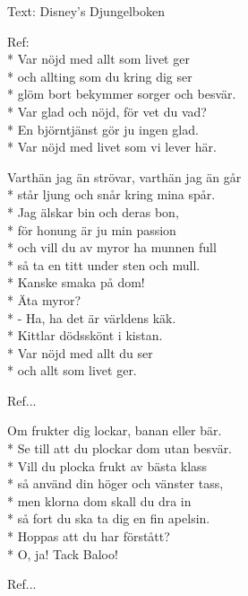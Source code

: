\begin{SongText}
    \begin{SongInfo}
        Text: Disney's Djungelboken
    \end{SongInfo}
    \begin{SongVerse}
        Ref:\\*%
        Var nöjd med allt som livet ger\\*%
        och allting som du kring dig ser\\*%
        glöm bort bekymmer sorger och besvär.\\*%
        Var glad och nöjd, för vet du vad?\\*%
        En björntjänst gör ju ingen glad.\\*%
        Var nöjd med livet som vi lever här.
    \end{SongVerse}
    \begin{SongVerse}
        Varthän jag än strövar, varthän jag än går\\*%
        står ljung och snår kring mina spår.\\*%
        Jag älskar bin och deras bon,\\*%
        för honung är ju min passion\\*%
        och vill du av myror ha munnen full\\*%
        så ta en titt under sten och mull.\\*%
        Kanske smaka på dom!\\*%
        Äta myror?\\*%
        - Ha, ha det är världens käk.\\*%
        Kittlar dödsskönt i kistan.\\*%
        Var nöjd med allt du ser\\*%
        och allt som livet ger.
    \end{SongVerse}
    \begin{SongVerse}
        Ref...
    \end{SongVerse}
    \begin{SongVerse}
        Om frukter dig lockar, banan eller bär.\\*%
        Se till att du plockar dom utan besvär.\\*%
        Vill du plocka frukt av bästa klass\\*%
        så använd din höger och vänster tass,\\*%
        men klorna dom skall du dra in\\*%
        så fort du ska ta dig en fin apelsin.\\*%
        Hoppas att du har förstått?\\*%
        O, ja! Tack Baloo!
    \end{SongVerse}
    \begin{SongVerse}
        Ref...
    \end{SongVerse}
\end{SongText}